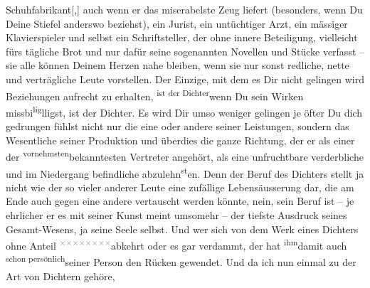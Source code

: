 \begin{ledgroupsized}[t]{13cm}
                  Schuhfabrikant{[},{]} auch wenn er das miserabelste Zeug liefert
               (besonders, wenn Du Deine Stiefel anderswo beziehst), ein \label{T_L03521-222v}\label{T_L03521-222h} Jurist, ein untüchtiger Arzt,
               ein mässiger Klavierspieler und selbst ein Schriftsteller, der ohne innere
               Beteiligung, vielleicht fürs tägliche Brot und nur dafür seine sogenannten Novellen
               und Stücke verfasst – sie alle können Deinem Herzen nahe bleiben, wenn sie nur sonst
               redliche, nette und verträgliche Leute vorstellen. Der Einzige, mit dem es Dir nicht
               gelingen wird Beziehungen aufrecht zu erhalten, \substVorne{}\textsuperscript{ist der Dichter}{\allowbreak}\substDazwischen{}wenn Du sein Wi\substHinten{}rken missbi\substVorne{}\textsuperscript{lig}\substDazwischen{}lli\substHinten{}gst, ist der Dichter. Es wird Dir umso weniger gelingen je öfter Du \introOben{}dich gedrungen fühlst\introOben{} nicht nur die eine oder andere seiner
               Leistungen, sondern das Wesentliche seiner Produktion und überdies die ganze
               Richtung, der er als einer der \substVorne{}\textsuperscript{vornehmsten}{\allowbreak}\substDazwischen{}bekanntesten\substHinten{} Vertreter angehört, als eine unfruchtbare verderbliche und im Niedergang
               befindliche ab\introOben{}zu\introOben{}lehn\substVorne{}\textsuperscript{st}\substDazwischen{}en\substHinten{}. Denn der Beruf des Dichters stellt ja nicht wie der so vieler anderer Leute
               eine zufällige Lebensäusserung dar, die am Ende auch gegen eine andere vertauscht
               werden könnte, nein, sein Beruf ist – je ehrlicher er es mit seiner Kunst meint
               umsomehr – der tiefste Ausdruck seines \introOben{}Gesam{\geminationm}t-\introOben{}Wesens, ja seine Seele selbst. Und wer sich
               von dem Werk eines Dichters ohne Anteil \substVorne{}\textsuperscript{\textcolor{gray}{×}\-\textcolor{gray}{×}\-\textcolor{gray}{×}\-\textcolor{gray}{×}\-\textcolor{gray}{×}\-\textcolor{gray}{×}\-\textcolor{gray}{×}\-\textcolor{gray}{×}}\substDazwischen{}abkehrt\substHinten{} oder es gar verdammt, der hat \substVorne{}\textsuperscript{ihm}\substDazwischen{}damit\substHinten{} auch \substVorne{}\textsuperscript{schon persönlich}{\allowbreak}\substDazwischen{}seiner Person\substHinten{} den Rücken gewendet. Und da ich nun einmal zu der Art von Dichtern gehöre,

\end{ledgroupsized}
